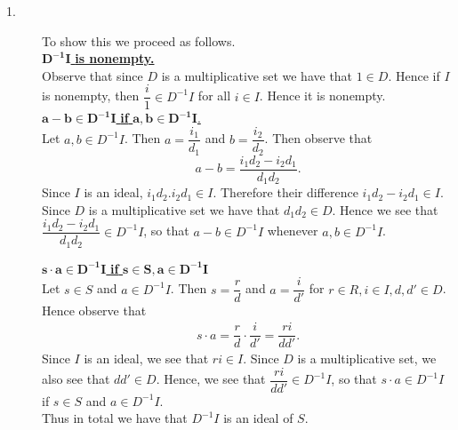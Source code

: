     \begin{prf}
        \begin{description}
            \item[1.] To show this we proceed as follows. \\
            \underline{$\bm{D^{-1}I} $ \textbf{is nonempty.}}\\[1.2ex]
            Observe that since $D$ is a multiplicative set we have that $1
            \in D$. Hence if $I$ is nonempty, then $\dfrac{i}{1} \in
            D^{-1}I$ for all $i \in I$. Hence it is nonempty.
            \\
    
            \noindent\underline{$\bm{a - b \in D^{-1}I}$ \textbf{if} $\bm{a, b
            \in D^{-1}I}$.}\\[1.2ex]
            Let $a, b \in D^{-1}I$. Then $a = \dfrac{i_1}{d_1}$ and $b =
            \dfrac{i_2}{d_2}$. Then observe that 
            \[
                a - b = \dfrac{i_1d_2 - i_2d_1}{d_1d_2}.
            \]
            Since $I$ is an ideal, $i_1d_2. i_2d_1 \in I$. Therefore their
            difference $i_1d_2 - i_2d_1 \in I$. Since $D$ is a
            multiplicative set we have that $d_1d_2 \in D$. Hence we see
            that $\dfrac{i_1d_2 - i_2d_1}{d_1d_2} \in D^{-1}I$, so that $a
            - b \in D^{-1}I$ whenever $a, b \in D^{-1}I$. 
    
            \noindent\underline{$\bm{s\cdot a\in D^{-1}I}$ \textbf{if} $\bm{s
            \in S, a \in D^{-1}I}$}\\[1.2ex]
            Let $s \in S$ and $a \in D^{-1}I$. Then $s = \dfrac{r}{d}$ and
            $a = \dfrac{i}{d'}$ for $r \in R, i \in I, d,d' \in D$. 
            Hence observe that 
            \begin{align*}
                s\cdot a = \dfrac{r}{d} \cdot \dfrac{i}{d'}
                = \dfrac{ri}{dd'}.
            \end{align*}
            Since $I$ is an ideal, we see that $ri \in I$. Since $D$ is a
            multiplicative set, we also see that $dd' \in D$. Hence, we
            see that $\dfrac{ri}{dd'} \in D^{-1}I$, so that $s\cdot a \in
            D^{-1}I$ if $s \in S$ and $a \in D^{-1}I$.\\
        Thus in total we have that $D^{-1}I$ is an ideal of $S$.
    

\end{description}
\end{prf}
